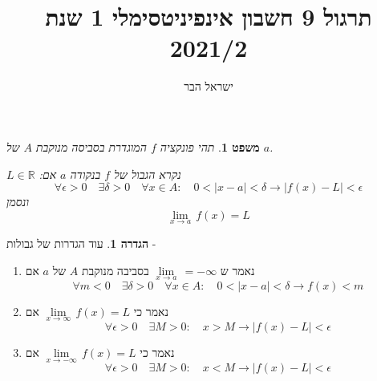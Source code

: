 \documentclass{article}
\begin{document}
\title{תרגול 9 חשבון אינפיניטסימלי 1 שנת 2021/2}
\author{ישראל הבר}
\maketitle

\newtheorem{theorem}{משפט}
\newtheorem{exercise}{תרגיל}
\newtheorem{homeexercise}{תרגיל לבית}
\newtheorem{example}{דוגמה}
\theoremstyle{definition}
\newtheorem{definition}{הגדרה}
\newtheorem{notation}{סימון}
\newtheorem{claim}{טענה}
\newtheorem{comment}{\emph{הערה}}
\renewcommand\qedsymbol{$\blacksquare$}
\newcommand{\limtoinfty}{\underset{n\rightarrow\infty}{\lim}}
\newcommand{\limtur}{\overset{\infty}{\underset{n=1}{\sum}}}
\newcommand{\limturstart}[1]{\overset{\infty}{\underset{n=#1}{\sum}}}
\newcommand{\limsuptoinfty}{\underset{n\rightarrow\infty}{\limsup}}
\newcommand{\liminftoinfty}{\underset{n\rightarrow\infty}{\liminf}}
\newcommand{\limtoinftym}{\underset{m\rightarrow\infty}{\lim}}
\newcommand{\limtop}{\underset{-}{\lim}}
\newcommand{\limbottom}{\overset{-}{\lim}}
\newcommand{\goesto}{\underset{n\rightarrow\infty}{\longrightarrow}}
\newcommand{\goestom}{\underset{m\rightarrow\infty}{\longrightarrow}}
\newcommand{\goesfrom}{\underset{n\rightarrow\infty}{\longleftarrow}}
\newcommand{\funclim}[2]{\underset{#1\rightarrow#2}{\lim}\,}
\newcommand{\series}[2]{\{#1\}_{#2\in\mathbb{N}}}

\begin{theorem}
תהי פונקציה 
$f$
המוגדרת בסביסה מנוקבת 
$A$
של 
$a$.
\par\noindent
$L\in\mathbb{R}$
נקרא הגבול של 
$f$
בנקודה 
$a$
אם:
\[\forall\epsilon>0\quad\exists\delta>0\quad \forall x\in A: \quad 0<|x-a|<\delta\longrightarrow |f(x)-L|<\epsilon\]
ונסמן 
\[\funclim{x}{a} f(x) = L\]
\end{theorem}

\begin{comment}
גבול לפי קושי שקול לגבול לפי היינה.
\end{comment}

\begin{definition}
עוד הגדרות של גבולות - 
\begin{enumerate}
\item נאמר ש
$\funclim{x}{a} = -\infty$
בסביבה מנוקבת 
$A$
של 
$a$
אם 
\[\forall m<0\quad\exists \delta>0\quad\forall x\in A:\quad 0<|x-a|<\delta\longrightarrow f(x)<m\]
\item נאמר כי 
$\funclim{x}{\infty} f(x) = L$
אם 
\[\forall\epsilon>0\quad\exists M>0:\quad x>M \longrightarrow |f(x)-L|<\epsilon\]
\item 
נאמר כי 
$\funclim{x}{-\infty} f(x) = L$
אם 
\[\forall\epsilon>0\quad\exists M>0:\quad x<M \longrightarrow |f(x)-L|<\epsilon\]
\end{enumerate}
\end{definition}
\end{document}
